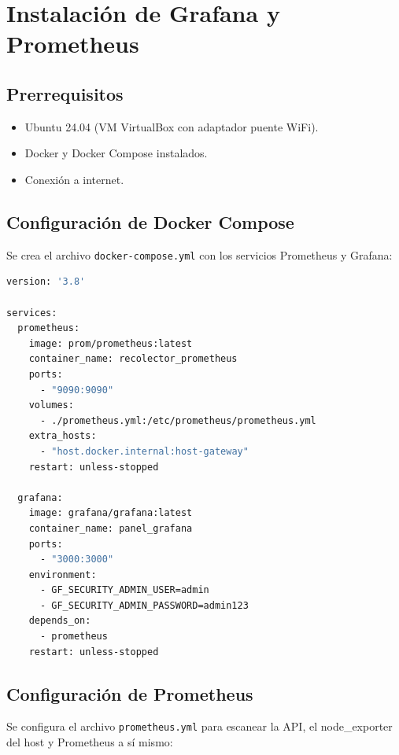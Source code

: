 \documentclass[12pt, a4paper]{article}
\begin{document}
\newpage

\section{Instalación de Grafana y Prometheus}

\subsection{Prerrequisitos}

\begin{itemize}
    \item Ubuntu 24.04 (VM VirtualBox con adaptador puente WiFi).
    \item Docker y Docker Compose instalados.
    \item Conexión a internet.
\end{itemize}

\subsection{Configuración de Docker Compose}

Se crea el archivo \texttt{docker-compose.yml} con los servicios Prometheus y Grafana:

\begin{lstlisting}[language=bash, caption={docker-compose.yml}, label={lst:docker-compose}]
version: '3.8'

services:
  prometheus:
    image: prom/prometheus:latest
    container_name: recolector_prometheus
    ports:
      - "9090:9090"
    volumes:
      - ./prometheus.yml:/etc/prometheus/prometheus.yml
    extra_hosts:
      - "host.docker.internal:host-gateway"
    restart: unless-stopped

  grafana:
    image: grafana/grafana:latest
    container_name: panel_grafana
    ports:
      - "3000:3000"
    environment:
      - GF_SECURITY_ADMIN_USER=admin
      - GF_SECURITY_ADMIN_PASSWORD=admin123
    depends_on:
      - prometheus
    restart: unless-stopped
\end{lstlisting}

\subsection{Configuración de Prometheus}

Se configura el archivo \texttt{prometheus.yml} para escanear la API, el node\_exporter del host y Prometheus a sí mismo:
\end{document}
